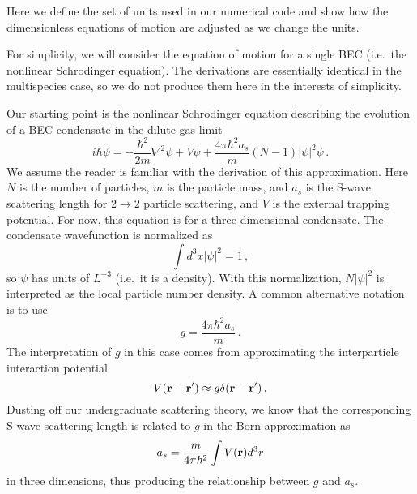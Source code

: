 \documentclass{revtex4}
\newcommand{\abs}[1]{\ensuremath{\left|#1\right|}}
\begin{document}
Here we define the set of units used in our numerical code and show how the dimensionless equations of motion are adjusted as we change the units.

For simplicity, we will consider the equation of motion for a single BEC (i.e.\ the nonlinear Schrodinger equation).  The derivations are essentially identical in the multispecies case, so we do not produce them here in the interests of simplicity.

Our starting point is the nonlinear Schrodinger equation describing the evolution of a BEC condensate in the dilute gas limit
\begin{equation}
  i\hbar\dot{\psi} = -\frac{\hbar^2}{2m}\nabla^2\psi + V\psi + \frac{4\pi\hbar^2 a_s}{m}(N-1)\abs{\psi}^2 \psi \, .
\end{equation}
We assume the reader is familiar with the derivation of this approximation.
Here $N$ is the number of particles, $m$ is the particle mass, and $a_s$ is the S-wave scattering length for $2\to 2$ particle scattering, and $V$ is the external trapping potential.  For now, this equation is for a three-dimensional condensate.
The condensate wavefunction is normalized as
\begin{equation}
  \int d^3x\abs{\psi}^2 = 1 \, ,
\end{equation}
so $\psi$ has units of $L^{-3}$ (i.e.\ it is a density).
With this normalization, $N\abs{\psi}^2$ is interpreted as the local particle number density.
A common alternative notation is to use
\begin{equation}
  g = \frac{4\pi\hbar^2a_s}{m} \, .
\end{equation}
The interpretation of $g$ in this case comes from approximating the interparticle interaction potential
\begin{equation}
  V({\bf r}-{\bf r'}) \approx g\delta({\bf r}-{\bf r'}) \, .
\end{equation}
Dusting off our undergraduate scattering theory, we know that the corresponding S-wave scattering length is related to $g$ in the Born approximation as
\begin{equation}
  a_s = \frac{m}{4\pi\hbar^2}\int V({\bf r}) d^3r
\end{equation}
in three dimensions, thus producing the relationship between $g$ and $a_s$.
\end{document}
